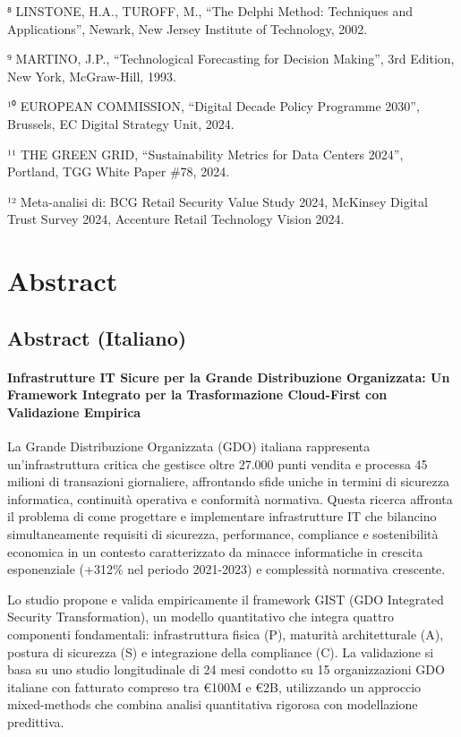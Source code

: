 \documentclass[12pt,a4paper,oneside]{book}
\begin{document}
⁸ LINSTONE, H.A., TUROFF, M., ``The Delphi Method: Techniques and
Applications'', Newark, New Jersey Institute of Technology, 2002.

⁹ MARTINO, J.P., ``Technological Forecasting for Decision Making'', 3rd
Edition, New York, McGraw-Hill, 1993.

¹⁰ EUROPEAN COMMISSION, ``Digital Decade Policy Programme 2030'',
Brussels, EC Digital Strategy Unit, 2024.

¹¹ THE GREEN GRID, ``Sustainability Metrics for Data Centers 2024'',
Portland, TGG White Paper \#78, 2024.

¹² Meta-analisi di: BCG Retail Security Value Study 2024, McKinsey
Digital Trust Survey 2024, Accenture Retail Technology Vision 2024.

\chapter{Abstract}\label{abstract-1}

\section{Abstract (Italiano)}\label{abstract-italiano}

\subsubsection{Infrastrutture IT Sicure per la Grande Distribuzione
Organizzata: Un Framework Integrato per la Trasformazione Cloud-First
con Validazione
Empirica}\label{infrastrutture-it-sicure-per-la-grande-distribuzione-organizzata-un-framework-integrato-per-la-trasformazione-cloud-first-con-validazione-empirica}

La Grande Distribuzione Organizzata (GDO) italiana rappresenta
un'infrastruttura critica che gestisce oltre 27.000 punti vendita e
processa 45 milioni di transazioni giornaliere, affrontando sfide uniche
in termini di sicurezza informatica, continuità operativa e conformità
normativa. Questa ricerca affronta il problema di come progettare e
implementare infrastrutture IT che bilancino simultaneamente requisiti
di sicurezza, performance, compliance e sostenibilità economica in un
contesto caratterizzato da minacce informatiche in crescita esponenziale
(+312\% nel periodo 2021-2023) e complessità normativa crescente.

Lo studio propone e valida empiricamente il framework GIST (GDO
Integrated Security Transformation), un modello quantitativo che integra
quattro componenti fondamentali: infrastruttura fisica (P), maturità
architetturale (A), postura di sicurezza (S) e integrazione della
compliance (C). La validazione si basa su uno studio longitudinale di 24
mesi condotto su 15 organizzazioni GDO italiane con fatturato compreso
tra €100M e €2B, utilizzando un approccio mixed-methods che combina
analisi quantitativa rigorosa con modellazione predittiva.
\end{document}

